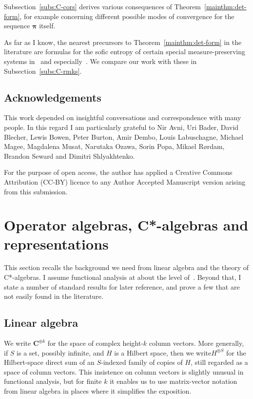 \documentclass[12pt,a4paper]{article}
\numberwithin{equation}{section}
\theoremstyle{remark}
\newcommand{\bbC}{\mathbf{C}}
\newcommand{\bspi}{\boldsymbol{\pi}}
\begin{document}
Subsection~\ref{subs:C-cors} derives various consequences of Theorem~\ref{mainthm:det-form}, for example concerning different possible modes of convergence for the sequence $\bspi$ itself.

As far as I know, the nearest precursors to Theorem~\ref{mainthm:det-form} in the literature are formulas for the sofic entropy of certain special measure-preserving systems in~\cite{Lyons05,Lyons10} and especially~\cite{Hayes16,Hayes21}.  We compare our work with these in Subsection~\ref{subs:C-rmks}.




\subsection*{Acknowledgements}

This work depended on insightful conversations and correspondence with many people.  In this regard I am particularly grateful to Nir Avni, Uri Bader, David Blecher, Lewis Bowen, Peter Burton, Amir Dembo, Louis Labuschagne, Michael Magee, Magdalena Musat, Narutaka Ozawa, Sorin Popa, Mikael R\o rdam, Brandon Seward and Dimitri Shlyakhtenko.

For the purpose of open access, the author has applied a Creative Commons Attribution (CC-BY) licence to any Author Accepted Manuscript version arising from this submission.












\section{Operator algebras, C*-algebras and representations}\label{sec:op-alg}

This section recalls the background we need from linear algebra and the theory of C*-algebras.  I assume functional analysis at about the level of~\cite{ReeSimFA}. Beyond that, I state a number of standard results for later reference, and prove a few that are not easily found in the literature.

\subsection{Linear algebra}\label{sec:lin-alg}

We write $\bbC^{\oplus k}$ for the space of complex height-$k$ column vectors.  More generally, if $S$ is a set, possibly infinite, and $H$ is a Hilbert space, then we write$H^{\oplus S}$ for the Hilbert-space direct sum of an $S$-indexed family of copies of $H$, still regarded as a space of column vectors. This insistence on column vectors is slightly unusual in functional analysis, but for finite $k$ it enables us to use matrix-vector notation from linear algebra in places where it simplifies the exposition.
\end{document}
